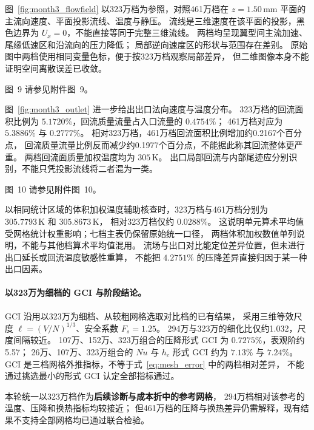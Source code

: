 \documentclass[stage2,fontset=fandol]{ydzjreport}
\makeatletter
\newcommand{\submissionnumber}[1]{\def\@currentlabel{#1}}
\makeatother
\begin{document}
图~\ref{fig:month3_flowfield} 以323万档为参照，对照461万档在
$z=1.50\,\mathrm{mm}$ 平面的主流向速度、平面投影流线、温度与静压。
流线是三维速度在该平面的投影，黑色边界为 $U_x=0$，不能直接等同于完整三维流线。
两档均呈现翼型间主流加速、尾缘低速区和沿流向的压力降低；
局部逆向速度区的形状与范围存在差别。
原始图中两档使用相同变量色标，便于按323万档观察局部差异，
但二维图像本身不能证明空间离散误差已收敛。


\par\noindent \begingroup\submissionnumber{9}\label{fig:month3_flowfield}\endgroup 图~9 请参见附件图~9。\par


图~\ref{fig:month3_outlet} 进一步给出出口法向速度与温度分布。
323万档的回流面积比例为 $5.1720\%$，回流质量流量占入口流量的 $0.4754\%$；
461万档对应为 $5.3886\%$ 与 $0.2777\%$。
相对323万档，461万档回流面积比例增加约0.2167个百分点，
回流质量流量比例反而减少约0.1977个百分点，不能据此称其回流整体更严重。
两档回流面质量加权温度均为 $305\,\mathrm{K}$。
出口局部回流与内部尾迹应分别识别，不能只凭投影流线将二者混为一类。


\par\noindent \begingroup\submissionnumber{10}\label{fig:month3_outlet}\endgroup 图~10 请参见附件图~10。\par


以相同统计区域的体积加权温度辅助核查时，323万档与461万档分别为
$305.7793\,\mathrm{K}$ 和 $305.8673\,\mathrm{K}$，
相对323万档仅约 $0.0288\%$。
这说明单元算术平均值受网格统计权重影响；七档主表仍保留原始统一口径，
两档体积加权数值单列说明，不能与其他档算术平均值混用。
流场与出口对比能定位差异位置，但未进行出口延长或回流温度敏感性重算，
不能把 $4.2751\%$ 的压降差异直接归因于某一种出口因素。

\paragraph{以323万为细档的 GCI 与阶段结论。}

GCI 沿用以323万为细档、从较粗网格选取对比档的已有结果，
采用三维等效尺度 $\ell=(V/N)^{1/3}$、安全系数 $F_s=1.25$。
294万与323万的细化比仅约1.032，尺度间隔较近。
107万、152万、323万组合的压降形式 GCI 为 $0.7275\%$，表观阶约5.57；
26万、107万、323万组合的 $Nu$ 与 $h_c$ 形式 GCI 约为 $7.13\%$ 与 $7.24\%$。
GCI 是三档网格外推指标，不等于式~\eqref{eq:mesh_error} 中的两档相对差异，
不能通过挑选最小的形式 GCI 认定全部指标通过。

本轮统一以323万档作为\textbf{后续诊断与成本折中的参考网格}，
294万档相对该参考的温度、压降和换热指标均较接近；
但461万档的压降与换热差异仍需解释，现有结果不支持全部网格均已通过联合检验。
\end{document}
